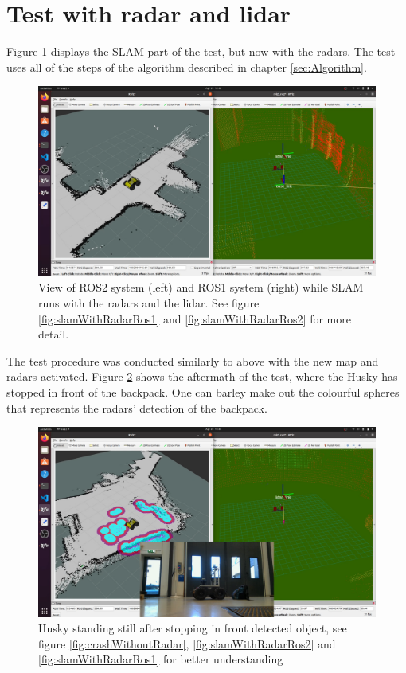 \section{Test with radar and lidar}
Figure \ref{fig:slamWithRadar} displays the SLAM part of the test, but now with the radars. The test uses all of the steps of the algorithm described in chapter \ref{sec:Algorithm}.

\begin{figure}[H]
    \centering
    \includegraphics[width=\textwidth]{Figures/slamWithRadar.png}
    \caption{View of ROS2 system (left) and ROS1 system (right) while SLAM runs with the radars and the lidar. See figure \ref{fig:slamWithRadarRos1} and \ref{fig:slamWithRadarRos2} for more detail.}
    \label{fig:slamWithRadar}
\end{figure}

The test procedure was conducted similarly to above with the new map and radars activated. Figure \ref{fig:crashWithRadar} shows the aftermath of the test, where the Husky has stopped in front of the backpack. One can barley make out the colourful spheres that represents the radars' detection of the backpack.

\begin{figure}[H]
    \centering
    \includegraphics[width=\textwidth]{Figures/crashWithRadar.png}
    \caption{Husky standing still after stopping in front detected object, see figure \ref{fig:crashWithoutRadar}, \ref{fig:slamWithRadarRos2} and \ref{fig:slamWithRadarRos1} for better understanding}
    \label{fig:crashWithRadar}
\end{figure}


